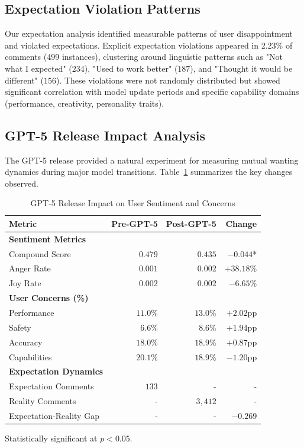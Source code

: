 \documentclass{article}
\begin{document}
\subsection{Expectation Violation Patterns}

Our expectation analysis identified measurable patterns of user disappointment and violated expectations. Explicit expectation violations appeared in 2.23\% of comments (499 instances), clustering around linguistic patterns such as "Not what I expected" ($234$), "Used to work better" ($187$), and "Thought it would be different" ($156$). These violations were not randomly distributed but showed significant correlation with model update periods and specific capability domains (performance, creativity, personality traits).

\subsection{GPT-5 Release Impact Analysis}

The GPT-5 release provided a natural experiment for measuring mutual wanting dynamics during major model transitions. Table~\ref{tab:gpt5_impact} summarizes the key changes observed.

\begin{table}[htbp]
\centering
\begin{threeparttable}
\label{tab:gpt5_impact}
\begin{tabular}{@{}lrrr@{}}
\toprule
Metric & Pre-GPT-5 & Post-GPT-5 & Change \\
\midrule
\textbf{Sentiment Metrics} & & & \\
Compound Score & $0.479$ & $0.435$ & $-0.044$* \\
Anger Rate & $0.001$ & $0.002$ & $+38.18\%$ \\
Joy Rate & $0.002$ & $0.002$ & $-6.65\%$ \\
\midrule
\textbf{User Concerns (\%)} & & & \\
Performance & $11.0\%$ & $13.0\%$ & $+2.02$pp \\
Safety & $6.6\%$ & $8.6\%$ & $+1.94$pp \\
Accuracy & $18.0\%$ & $18.9\%$ & $+0.87$pp \\
Capabilities & $20.1\%$ & $18.9\%$ & $-1.20$pp \\
\midrule
\textbf{Expectation Dynamics} & & & \\
Expectation Comments & $133$ & - & - \\
Reality Comments & - & $3,412$ & - \\
Expectation-Reality Gap & - & - & $-0.269$ \\
\bottomrule
\end{tabular}
\begin{tablenotes}
\small
\item[*] Statistically significant at $p<0.05$.
\end{tablenotes}
\caption{GPT-5 Release Impact on User Sentiment and Concerns}
\end{threeparttable}
\end{table}
\end{document}
